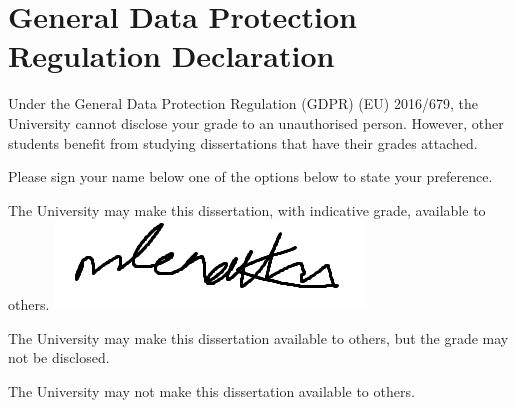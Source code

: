 
\section*{General Data Protection Regulation Declaration}
\vspace{0.5cm}
\begin{flushleft}
Under the General Data Protection Regulation (GDPR) (EU) 2016/679, the University cannot disclose your grade to an unauthorised person. However, other students benefit from studying dissertations that have their grades attached. \newline

\vspace{0.5cm}

Please sign your name below one of the options below to state your preference.\newline
\vspace{0.5cm}

The University may make this dissertation, with indicative grade, available to others.\newline
\vspace{3cm}
\includegraphics[height=2\baselineskip]{figures/sig.png}

The University may make this dissertation available to others, but the grade may not be disclosed.\newline
\vspace{3cm}


The University may not make this dissertation available to others.\newline
\end{flushleft}


